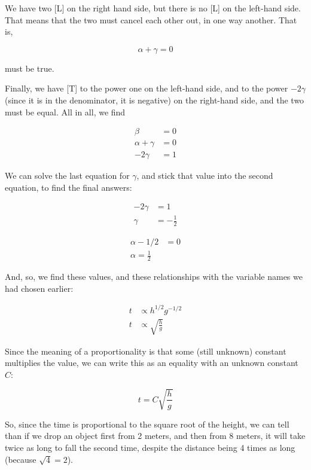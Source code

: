  We have two [L] on the right hand side, but there is no [L] on the left-hand side. That means that the two must cancel each other out, in one way another. That is,
 
\begin{equation*}
 \alpha + \gamma = 0
\end{equation*}

must be true.

Finally, we have [T] to the power one on the left-hand side, and to the power $-2\gamma$ (since it is in the denominator, it is negative) on the right-hand side, and the two must be equal. All in all, we find

\begin{align*}
\beta &= 0\\
\alpha + \gamma &= 0\\
-2\gamma &= 1
\end{align*}

We can solve the last equation for $\gamma$, and stick that value into the second equation, to find the final answers:

\begin{align*}
-2\gamma &= 1\\
\gamma &= -\frac{1}{2}
\end{align*}

\begin{align*}
\alpha - 1/2 &= 0\\
\alpha = \frac{1}{2}
\end{align*}

And, so, we find these values, and these relationships with the variable names we had chosen earlier:

\begin{align}
t &\propto h^{1/2} g^{-1/2} \\
t &\propto \sqrt{\frac{h}{g}}
\end{align}

Since the meaning of a proportionality is that some (still unknown) constant multiplies the value, we can write this as an equality with an unknown constant $C$:

\begin{equation}
 t = C \sqrt{\frac{h}{g}}
\end{equation}

So, since the time is proportional to the square root of the height, we can tell than if we drop an object first from 2 meters, and then from 8 meters, it will take twice as long to fall the second time, despite the distance being 4 times as long (because $\sqrt{4} = 2$).

